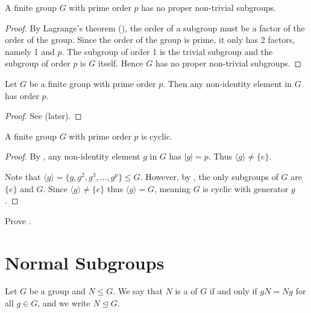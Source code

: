 \begin{corollary}\label{corollary-group-with-prime-order-subgroups}
    A finite group $G$ with prime order $p$ has no proper non-trivial subgroups.
\end{corollary}
\begin{proof}
    By Lagrange's theorem (), the order of a subgroup must be a factor of the order of the group. Since the order of the group is prime, it only has 2 factors, namely 1 and $p$. The subgroup of order 1 is the trivial subgroup and the subgroup of order $p$ is $G$ itself. Hence $G$ has no proper non-trivial subgroups.
\end{proof}

\begin{corollary}\label{corollary-prime-order-element}
    Let $G$ be a finite group with prime order $p$. Then any non-identity element in $G$ has order $p$.
\end{corollary}
\begin{proof}
    See  (later).
\end{proof}

\begin{corollary}\label{corollary-group-with-prime-order-is-cyclic}
    A finite group $G$ with prime order $p$ is cyclic.
\end{corollary}
\begin{proof}
    By , any non-identity element $g$ in $G$ has $|g| = p$. Thus $\langle g \rangle \neq \{e\}$.

    Note that $\langle g \rangle = \{g, g^2, g^3, \dots, g^p\} \leq G$. However, by , the only subgroups of $G$ are $\{e\}$ and $G$. Since $\langle g \rangle \neq \{e\}$ thus $\langle g \rangle = G$, meaning $G$ is cyclic with generator $g$.
\end{proof}

\begin{exercise}\label{exercise-prime-order-element}
    Prove .
\end{exercise}

\section{Normal Subgroups}
\begin{definition}
    Let $G$ be a group and $N \leq G$. We say that $N$ is a  of $G$ if and only if $gN = Ng$ for all $g \in G$, and we write $N \unlhd G$.
\end{definition}

